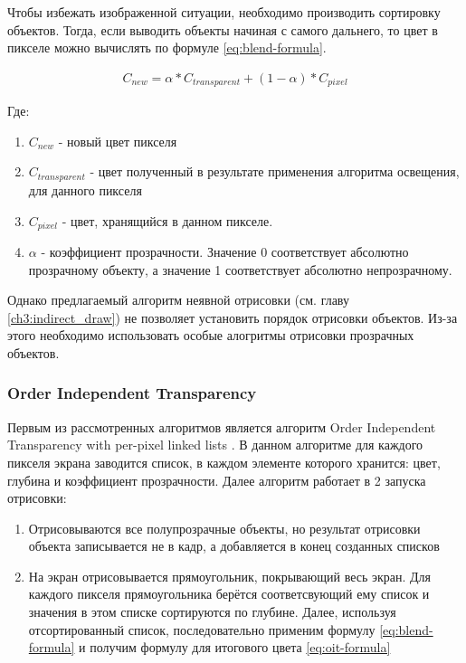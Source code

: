 		Чтобы избежать изображенной ситуации, необходимо производить сортировку объектов. Тогда, если выводить объекты начиная с самого дальнего, то цвет в пикселе можно вычислять по формуле \ref{eq:blend-formula}.
		
		\begin{equation}
			\label{eq:blend-formula}
			\begin{multlined}
				C_{new} = \alpha * C_{transparent} + (1 - \alpha) * C_{pixel}
			\end{multlined}
		\end{equation}
		
		Где:
		\begin{enumerate}[1.]
			\item $C_{new}$ - новый цвет пикселя
			\item $C_{transparent}$ - цвет полученный в результате применения алгоритма освещения, для данного пикселя
			\item $C_{pixel}$ - цвет, хранящийся в данном пикселе.
			\item $\alpha$ - коэффициент прозрачности. Значение 0 соответствует абсолютно прозрачному объекту, а значение 1 соответствует абсолютно непрозрачному.
		\end{enumerate}
		
		Однако предлагаемый алгоритм неявной отрисовки (см. главу \ref{ch3:indirect_draw}) не позволяет установить порядок отрисовки объектов. Из-за этого необходимо использовать особые алогритмы отрисовки прозрачных объектов.		
		
		\subsubsection{Order Independent Transparency} \label{ch3:render_pass:transparents:oit}
			Первым из рассмотренных алгоритмов является алгоритм Order Independent Transparency with per-pixel linked lists \cite{barta2011order}. В данном алгоритме для каждого пикселя экрана заводится список, в каждом элементе которого хранится: цвет, глубина и коэффициент прозрачности. Далее алгоритм работает в 2 запуска отрисовки:
			
			\begin{enumerate}[1.]
				\item Отрисовываются все полупрозрачные объекты, но результат отрисовки объекта записывается не в кадр, а добавляется в конец созданных списков
				\item На экран отрисовывается прямоугольник, покрывающий весь экран. Для каждого пикселя прямоугольника берётся соответсвующий ему список и значения в этом списке сортируются по глубине. Далее, используя отсортированный список, последовательно применим формулу \ref{eq:blend-formula} и получим формулу для итогового цвета \ref{eq:oit-formula}
			\end{enumerate}
			
